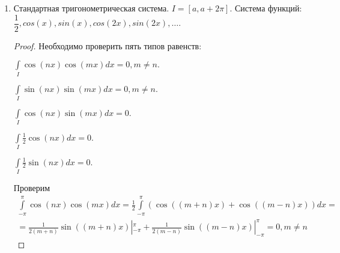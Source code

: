 \begin{example}
\begin{enumerate}
\begin{proof}
			$\dfrac{d^{j+1}}{dx^{j+1}}((x^2-1)^n)=\left((x-1)^{n-j}g_j(x)\right)'=(n-j)(x-1)^{n-j-1}g_j(x)+(x-1)^{n-j}g_j'(x)=(x-1)^{n-(j+1)}((n-j)g_j(x)+(x-1)g_j'(x))$. В качестве $g_{j+1}(x)=(n-j)g_j(x)+(x-1)g_j'(x)$.
			
			Следующее утверждение будет также справедливо: $\dfrac{d^j}{dx^j}((x^2-1)^n)=(x+1)^{n-j}g_j(x)$, где $g_j(x)$ --- многочлены степени $n$, для $j=0,1,\ldots, n$.
			
			Возвращаясь к доказательству получаем, что
			
			$\dfrac{d^{j}}{dx^j}((x^2-1)^n)|_{x=\pm1}=0, j=0,\ldots,n-1$. Интегрируя по частям $\mathcal{J}$, загоняя первый сомножитель под дифференциал, получаем: 
			\begin{multline*}
				\mathcal{J}=-\int\limits_{-1}^1\dfrac{d^{n-1}}{dx^{n-1}}((x^2-1)^n)\dfrac{d^{k+1}}{dx^{k+1}}((x^2-1)^k)dx=\overset{n \text{ раз интегрируя по частям}}{\ldots}=\\=(-1)^n\int\limits_{-1}^1(x^2-1)^n\dfrac{d^{k+1}}{dx^{k+n}}((x^2-1)^k)dx=0,
			\end{multline*}
			так как берем производную порядка больше чем степень многочлена:$k+n>2\cdot  k$.
		\end{proof}
		\item Стандартная тригонометрическая система. $I=[a,a+2\pi]$. Система функций: $\dfrac{1}{2}, cos(x),sin(x),cos(2x),sin(2x),\ldots$.
		\begin{proof}
			Необходимо проверить пять типов равенств:
			
			$\int\limits_{I}\cos(nx)\cos(mx)dx=0, m\ne n.$
			
			$\int\limits_{I}\sin(nx)\sin(mx)dx=0, m\ne n.$
			
			$\int\limits_{I}\cos(nx)\sin(mx)dx=0.$
			
			$\int\limits_{I}\frac{1}{2}\cos(nx)dx=0.$
			
			$\int\limits_{I}\frac{1}{2}\sin(nx)dx=0.$
			
			Проверим
			\begin{multline*}
				\int\limits_{-\pi}^{\pi}\cos(nx)\cos(mx)dx=\frac{1}{2}\int\limits_{-\pi}^{\pi}(\cos((m+n)x)+\cos((m-n)x))dx=\\= \frac{1}{2(m+n)}\sin((m+n)x)|_{-\pi}^{\pi}+\frac{1}{2(m-n)}\sin((m-n)x)|_{-\pi}^{\pi}=0, m\ne n
			\end{multline*} 
		\end{proof}
	\end{enumerate}
\end{example}

